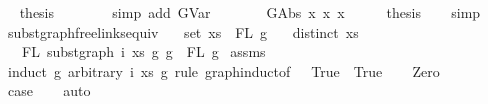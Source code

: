 \begin{isabellebody}
\ \isamarkupfalse%
\ {\isacharquery}{\kern0pt}thesis\isanewline
\ \ \ \ \ \ \isamarkupfalse%
\ {\isacharparenleft}{\kern0pt}simp\ add{\isacharcolon}{\kern0pt}\ GVar{\isacharparenright}{\kern0pt}\isanewline
\ \ \ \isamarkupfalse%
\isanewline
{}\isamarkupfalse%
\isanewline
\ \ \isamarkupfalse%
\ {\isacharparenleft}{\kern0pt}GAbs\ x{}{}\ x{}{}\ x{}{}{\isacharparenright}{\kern0pt}\isanewline
\ \ \isamarkupfalse%
\ \isamarkupfalse%
\ {\isacharquery}{\kern0pt}thesis\isanewline
\ \ \isamarkupfalse%
\ simp\isanewline
{}\isamarkupfalse%
%
\endisatagproof
{\isafoldproof}%
%
\isadelimproof
\isanewline
%
\endisadelimproof
\isanewline
\isanewline
{}\isamarkupfalse%
\ subst{\isacharunderscore}{\kern0pt}graph{\isacharunderscore}{\kern0pt}freelinks{\isacharunderscore}{\kern0pt}equiv{\isacharcolon}{\kern0pt}\isanewline
\ \ \ {\isachardoublequoteopen}set\ xs\ {\isacharequal}{\kern0pt}\ FL\ g{}{\isachardoublequoteclose}\isanewline
\ \ \ {\isachardoublequoteopen}distinct\ xs{\isachardoublequoteclose}\isanewline
\ \ \ {\isachardoublequoteopen}FL\ {\isacharparenleft}{\kern0pt}subst{\isacharunderscore}{\kern0pt}graph\ i\ xs\ g{}\ g{\isacharparenright}{\kern0pt}\ {\isacharequal}{\kern0pt}\ FL\ g{\isachardoublequoteclose}\isanewline
%
\isadelimproof
%
\endisadelimproof
%
\isatagproof
{}\isamarkupfalse%
\ assms\isanewline
{}\isamarkupfalse%
\ {\isacharparenleft}{\kern0pt}induct\ g\ arbitrary{\isacharcolon}{\kern0pt}\ i\ xs\ g{}\ rule{\isacharcolon}{\kern0pt}\ graph{\isachardot}{\kern0pt}induct{\isacharbrackleft}{\kern0pt}of\ {\isacharunderscore}{\kern0pt}\ {\isachardoublequoteopen}{\isacharpercent}{\kern0pt}{\isacharunderscore}{\kern0pt}{\isachardot}{\kern0pt}\ True{\isachardoublequoteclose}\ {\isachardoublequoteopen}{\isacharpercent}{\kern0pt}{\isacharunderscore}{\kern0pt}{\isachardot}{\kern0pt}\ True{\isachardoublequoteclose}{\isacharbrackright}{\kern0pt}{\isacharparenright}{\kern0pt}\isanewline
\ \ \isamarkupfalse%
\ Zero\isanewline
\ \ \isamarkupfalse%
\ \isamarkupfalse%
\ {\isacharquery}{\kern0pt}case\isanewline
\ \ \isamarkupfalse%
\ auto\isanewline
{}\isamarkupfalse%
\isanewline

\end{isabellebody}
